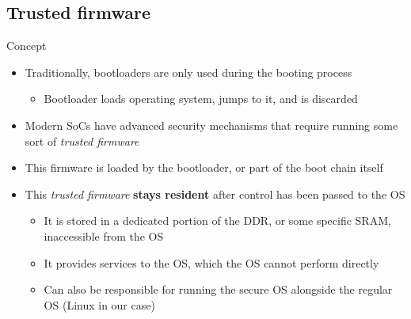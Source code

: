 \subsection{Trusted firmware}

\begin{frame}{Concept}
  \begin{itemize}
  \item Traditionally, bootloaders are only used during the booting
    process
    \begin{itemize}
    \item Bootloader loads operating system, jumps to it, and is
      discarded
    \end{itemize}
  \item Modern SoCs have advanced security mechanisms that require
    running some sort of {\em trusted firmware}
  \item This firmware is loaded by the bootloader, or part of the boot
    chain itself
  \item This {\em trusted firmware} {\bf stays resident} after control
    has been passed to the OS
    \begin{itemize}
    \item It is stored in a dedicated portion of the DDR, or some
      specific SRAM, inaccessible from the OS
    \item It provides services to the OS, which the OS cannot perform
      directly
    \item Can also be responsible for running the secure OS alongside the
      regular OS (Linux in our case)
    \end{itemize}
  \end{itemize}
\end{frame}

